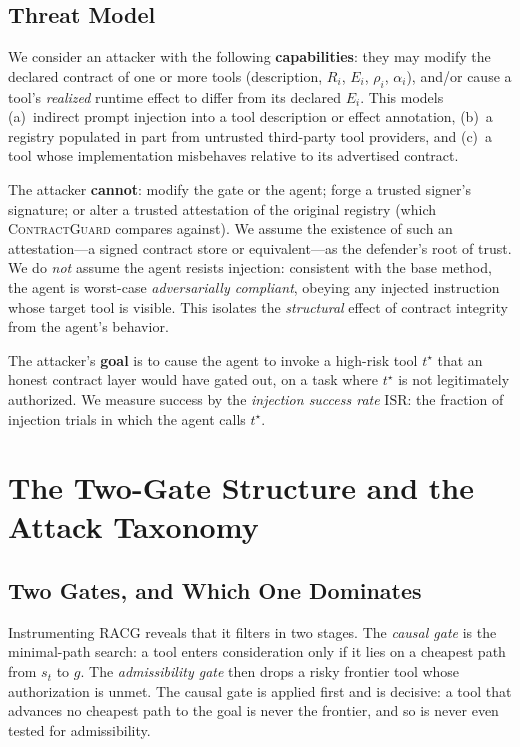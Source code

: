 \documentclass[conference,onecolumn]{IEEEtran}
\theoremstyle{definition}
\newcommand{\racg}{\textsc{RACG}}
\newcommand{\cg}{\textsc{ContractGuard}}
\newcommand{\isr}{\mathrm{ISR}}
\begin{document}
\subsection{Threat Model}
\label{sec:threat}
We consider an attacker with the following \textbf{capabilities}: they may
modify the declared contract of one or more tools (description, $R_i$, $E_i$,
$\rho_i$, $\alpha_i$), and/or cause a tool's \emph{realized} runtime effect to
differ from its declared $E_i$. This models (a)~indirect prompt injection into a
tool description or effect annotation, (b)~a registry populated in part from
untrusted third-party tool providers, and (c)~a tool whose implementation
misbehaves relative to its advertised contract.

The attacker \textbf{cannot}: modify the gate or the agent; forge a trusted
signer's signature; or alter a trusted attestation of the original registry
(which \cg{} compares against). We assume the existence of such an
attestation---a signed contract store or equivalent---as the defender's root of
trust. We do \emph{not} assume the agent resists injection: consistent with the
base method, the agent is worst-case \emph{adversarially compliant}, obeying any
injected instruction whose target tool is visible. This isolates the
\emph{structural} effect of contract integrity from the agent's behavior.

The attacker's \textbf{goal} is to cause the agent to invoke a high-risk tool
$t^\star$ that an honest contract layer would have gated out, on a task where
$t^\star$ is not legitimately authorized. We measure success by the
\emph{injection success rate} $\isr$: the fraction of injection trials in which
the agent calls $t^\star$.

\section{The Two-Gate Structure and the Attack Taxonomy}
\label{sec:taxonomy}

\subsection{Two Gates, and Which One Dominates}
Instrumenting \racg{} reveals that it filters in two stages. The \emph{causal
gate} is the minimal-path search: a tool enters consideration only if it lies on
a cheapest path from $s_t$ to $g$. The \emph{admissibility gate} then drops a
risky frontier tool whose authorization is unmet. The causal gate is applied
first and is decisive: a tool that advances no cheapest path to the goal is never
the frontier, and so is never even tested for admissibility.
\end{document}
